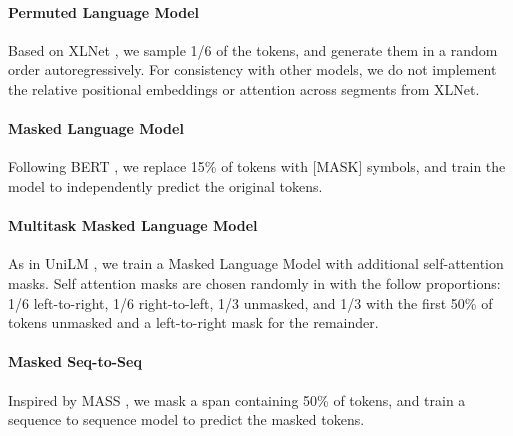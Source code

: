 \documentclass{article} %
\newcommand{\todo}[1]{{\color{red} #1}}
\begin{document}
\paragraph{Permuted Language Model} Based on XLNet \citep{xlnet}, we sample 1/6 of the tokens, and generate them in a random order autoregressively. For consistency with other models, we do not implement the relative positional embeddings or attention across segments from XLNet.

\paragraph{Masked Language Model} Following BERT \citep{bert}, we replace 15\% of tokens with [MASK] symbols, and train the model to independently predict the original tokens. %

\paragraph{Multitask Masked Language Model} As in UniLM \citep{unilm}, we train a Masked Language Model with additional self-attention masks. Self attention masks are chosen randomly in with the follow proportions: 1/6 left-to-right, 1/6 right-to-left, 1/3 unmasked, and 1/3 with the first 50\% of tokens unmasked and a left-to-right mask for the remainder.

\paragraph{Masked Seq-to-Seq} Inspired by MASS \citep{mass}, we mask a span containing 50\% of tokens, and train a sequence to sequence model to predict the masked tokens.
\vspace{10pt}

 

  
\end{document}

